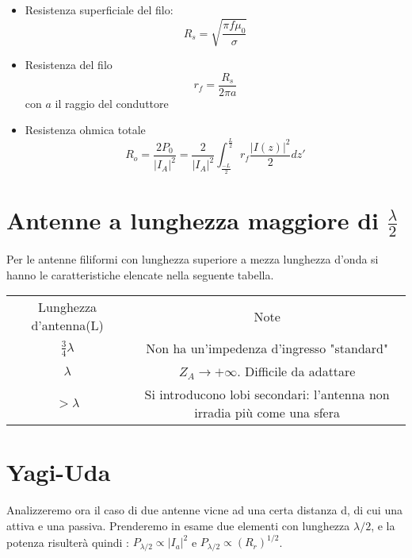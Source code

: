 \begin{itemize}
\begin{esp}
        &=  =  
      \end{esp}
    \item Resistenza superficiale del filo:
        \begin{equation}
          R_s = \sqrt{\frac{\pi f \mu_0}{\sigma}}
        \end{equation}
    \item Resistenza del filo
      \begin{equation}
        r_f = \frac{R_s}{2\pi a}
      \end{equation}
      con $a$ il raggio del conduttore
    \item Resistenza ohmica totale
      \begin{equation}
        R_o = \frac{2 P_0}{\left |I_A \right |^{2}} = \frac{2}{\left |I_A \right |^{2}} \int_{\frac{-L}{2}}^{\frac{L}{2}} r_f \frac{\left |I(z) \right |^{2}}{2}dz'
      \end{equation}
\end{itemize}

\section{Antenne a lunghezza maggiore di $\frac{\lambda}{2}$}
Per le antenne filiformi con lunghezza superiore a mezza lunghezza d'onda si hanno le caratteristiche elencate nella seguente tabella.
\begin{table}[hb!]
\centering
\begin{tabular}{cc}
Lunghezza d'antenna(L) & Note\\
$\frac{3}{4}\lambda$      & Non ha un'impedenza d'ingresso "standard"\\
$\lambda$                 & $Z_A \to +\infty$. Difficile da adattare \\
$>\lambda$                & \parbox{7cm}{Si introducono lobi secondari: l'antenna non irradia più come una sfera}
\end{tabular}
\end{table}

\section{Yagi-Uda}
Analizzeremo ora il caso di due antenne vicne ad una certa distanza d, di cui una attiva e una passiva.
Prenderemo in esame due elementi con lunghezza $\lambda/2$, e la potenza risulterà quindi : $P_{\lambda/2}\propto \left | I_a \right |^2$ e $P_{\lambda/2}\propto (R_r)^{1/2}$.


